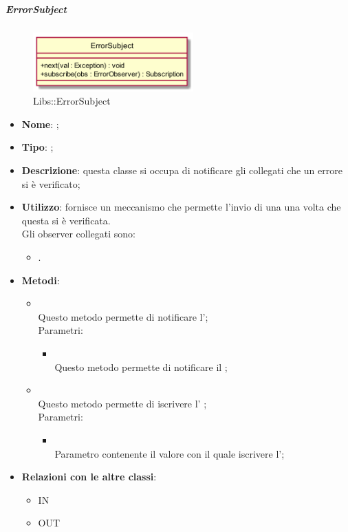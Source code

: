 \hypertarget{ErrorSubject_label}{\subparagraph{ErrorSubject}}
\begin{figure}[h]
	\centering
	\includegraphics[width=0.55\textwidth,height=\textheight,keepaspectratio]{images/ClassErrorSubject.png}
	\caption{Libs::ErrorSubject}
\end{figure}
\begin{itemize}
	\item \textbf{Nome}: ;
	\item \textbf{Tipo}: ;
	\item \textbf{Descrizione}: questa classe si occupa di notificare gli  collegati che un errore si è verificato;
	\item \textbf{Utilizzo}: fornisce un meccanismo che permette l'invio di una  una volta che questa si è verificata.\\
 Gli observer collegati sono:
\begin{itemize}
\item {}.
\end{itemize}
	\item \textbf{Metodi}:
	\begin{itemize}
		\item[]  \\		Questo metodo permette di notificare l';\\
		Parametri:
		\begin{itemize}
			\item {} \\
			Questo metodo permette di notificare il ;
		\end{itemize}
		\item[]  \\			Questo metodo permette di iscrivere l' ;\\
		Parametri:
		\begin{itemize}
			\item {} \\
			Parametro contenente il valore con il quale iscrivere l';
		\end{itemize}
	\end{itemize}
	\item \textbf{Relazioni con le altre classi}:
	\begin{itemize}
		\item IN \hyperlink{Exception_label}{}
		\item OUT \hyperlink{ErrorObserver_label}{}
	\end{itemize}
\end{itemize}
\FloatBarrier

